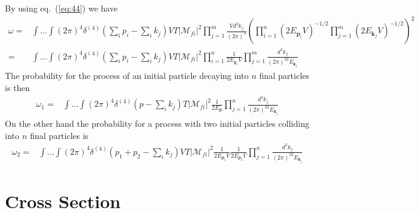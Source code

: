 By using eq.~(\ref{eq:44}) we have
\begin{align}
  \omega=&\int\ldots\int 
(2\pi)^4\delta^{(4)}\left(\sum_i p_i-\sum_i k_j\right)V T 
\left|\mathcal{M}_{fi}\right|^2
\prod_{j=1}^m\frac{Vd^3k_j}{(2\pi)^3}
\left(\prod_{i=1}^{n}\left(2E_{\mathbf{p}_i}V\right)^{-1/2}
\prod_{j=1}^{m}\left(2E_{\mathbf{k}_j}V\right)^{-1/2}\right)^2\nonumber\\
=&\int\ldots\int 
(2\pi)^4\delta^{(4)}\left(\sum_i p_i-\sum_i k_j\right)V T 
\left|\mathcal{M}_{fi}\right|^2
\prod_{i=1}^{n}\frac{1}{2E_{\mathbf{p}_i}V}
\prod_{j=1}^m\frac{d^3k_j}{(2\pi)^32E_{\mathbf{k}_j}}
\end{align}
The probability for the process of an initial particle decaying into $n$ final particles is then
\begin{align}
\label{eq:146}
 \omega_1 =&\int\ldots\int 
(2\pi)^4\delta^{(4)}\left(p-\sum_i k_j\right)T 
\left|\mathcal{M}_{fi}\right|^2
\frac{1}{2E_{\mathbf{p}}}
\prod_{j=1}^n\frac{d^3k_j}{(2\pi)^32E_{\mathbf{k}_j}}
\end{align}
On the other hand the probability for a process with two initial particles colliding into $n$ final particles is
\begin{align}
\label{eq:w2}
 \omega_2 =&\int\ldots\int 
(2\pi)^4\delta^{(4)}\left(p_1+p_2-\sum_i k_j\right)VT 
\left|\mathcal{M}_{fi}\right|^2
\frac{1}{2E_{\mathbf{p}_1}V}\frac{1}{2E_{\mathbf{p}_2}V}
\prod_{j=1}^n\frac{d^3k_j}{(2\pi)^32E_{\mathbf{k}_j}}
\end{align}


\section{Cross Section}
\label{sec:cross-section}


